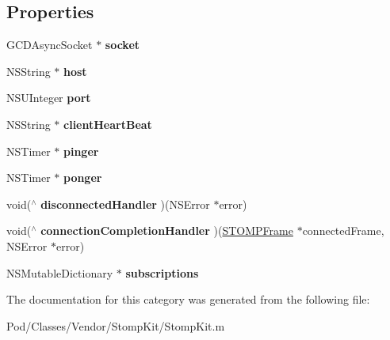 \subsection*{Properties}
\begin{DoxyCompactItemize}
\item 
G\+C\+D\+Async\+Socket $\ast$ {\bfseries socket}\hypertarget{category_s_t_o_m_p_client_07_08_aeb7b9d590b9c1645c35fc5bfa9f5a69f}{}\label{category_s_t_o_m_p_client_07_08_aeb7b9d590b9c1645c35fc5bfa9f5a69f}

\item 
N\+S\+String $\ast$ {\bfseries host}\hypertarget{category_s_t_o_m_p_client_07_08_af774921915fc3a03a810a4b4ec36d333}{}\label{category_s_t_o_m_p_client_07_08_af774921915fc3a03a810a4b4ec36d333}

\item 
N\+S\+U\+Integer {\bfseries port}\hypertarget{category_s_t_o_m_p_client_07_08_abcfd870e74cfc7a3b4794642a2927780}{}\label{category_s_t_o_m_p_client_07_08_abcfd870e74cfc7a3b4794642a2927780}

\item 
N\+S\+String $\ast$ {\bfseries client\+Heart\+Beat}\hypertarget{category_s_t_o_m_p_client_07_08_a1fc393c3da18e07e61a6ce67872243f1}{}\label{category_s_t_o_m_p_client_07_08_a1fc393c3da18e07e61a6ce67872243f1}

\item 
N\+S\+Timer $\ast$ {\bfseries pinger}\hypertarget{category_s_t_o_m_p_client_07_08_a9d0a4ea3ff134e31d07b4fa083cc86a9}{}\label{category_s_t_o_m_p_client_07_08_a9d0a4ea3ff134e31d07b4fa083cc86a9}

\item 
N\+S\+Timer $\ast$ {\bfseries ponger}\hypertarget{category_s_t_o_m_p_client_07_08_aef472d35a76591acf98a931bdacfd3e2}{}\label{category_s_t_o_m_p_client_07_08_aef472d35a76591acf98a931bdacfd3e2}

\item 
void($^\wedge$ {\bfseries disconnected\+Handler} )(N\+S\+Error $\ast$error)\hypertarget{category_s_t_o_m_p_client_07_08_a83ed3d82bf127fc4bcdea8e04ffd542a}{}\label{category_s_t_o_m_p_client_07_08_a83ed3d82bf127fc4bcdea8e04ffd542a}

\item 
void($^\wedge$ {\bfseries connection\+Completion\+Handler} )(\hyperlink{interface_s_t_o_m_p_frame}{S\+T\+O\+M\+P\+Frame} $\ast$connected\+Frame, N\+S\+Error $\ast$error)\hypertarget{category_s_t_o_m_p_client_07_08_a331f6c0b4ee19b3cfc2ba2fd2b8a8fce}{}\label{category_s_t_o_m_p_client_07_08_a331f6c0b4ee19b3cfc2ba2fd2b8a8fce}

\item 
N\+S\+Mutable\+Dictionary $\ast$ {\bfseries subscriptions}\hypertarget{category_s_t_o_m_p_client_07_08_aef5ec484f25252e606aa9668d088b46b}{}\label{category_s_t_o_m_p_client_07_08_aef5ec484f25252e606aa9668d088b46b}

\end{DoxyCompactItemize}


The documentation for this category was generated from the following file\+:\begin{DoxyCompactItemize}
\item 
Pod/\+Classes/\+Vendor/\+Stomp\+Kit/Stomp\+Kit.\+m\end{DoxyCompactItemize}
